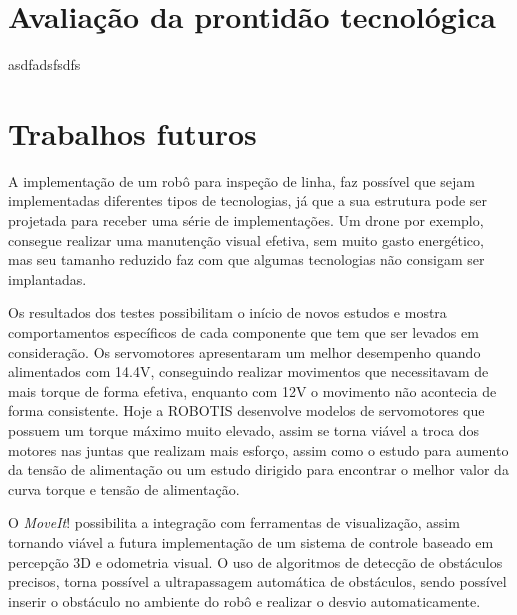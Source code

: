 \section{Avaliação da prontidão tecnológica}
\label{sec:trl}
asdfadsfsdfs

\section{Trabalhos futuros}
\label{sec:trabfut}
A implementação de um robô para inspeção de linha, faz possível que sejam implementadas diferentes tipos de tecnologias, já que a sua estrutura pode ser projetada para receber uma série de implementações. Um drone por exemplo, consegue realizar uma manutenção visual efetiva, sem muito gasto energético, mas seu tamanho reduzido faz com que algumas tecnologias não consigam ser implantadas.

Os resultados dos testes possibilitam o início de novos estudos e mostra comportamentos específicos de cada componente que tem que ser levados em consideração. Os servomotores apresentaram um melhor desempenho quando alimentados com 14.4V, conseguindo realizar movimentos que necessitavam de mais torque de forma efetiva, enquanto com 12V o movimento não acontecia de forma consistente. Hoje a ROBOTIS desenvolve modelos de servomotores que possuem um torque máximo muito elevado, assim se torna viável a troca dos motores nas juntas que realizam mais esforço, assim como o estudo para aumento da tensão de alimentação ou um estudo dirigido para encontrar o melhor valor da curva torque e tensão de alimentação.

O \textit{MoveIt}! possibilita a integração com ferramentas de visualização, assim tornando viável a futura implementação de um sistema de controle baseado em percepção 3D e odometria visual. O uso de algoritmos de detecção de obstáculos precisos, torna possível a ultrapassagem automática de obstáculos, sendo possível inserir o obstáculo no ambiente do robô e realizar o desvio automaticamente.







